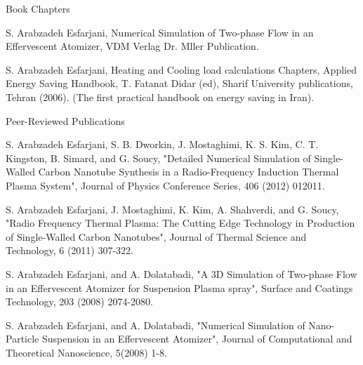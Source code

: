 


\begin{cventries}


\cventry
{} %
{Book Chapters} %
{} %
{} %
{ %
\vspace{-3 mm}
\begin{cvitems}
\item {S. Arabzadeh Esfarjani, Numerical Simulation of Two-phase Flow in an Effervescent Atomizer, VDM Verlag Dr. Mller Publication.}
\item {S. Arabzadeh Esfarjani, Heating and Cooling load calculations Chapters, Applied Energy
Saving Handbook, T. Fatanat Didar (ed), Sharif University publications, Tehran (2006).
(The first practical handbook on energy saving in Iran).\\}
\end{cvitems}
}


\cventry
{} %
{Peer-Reviewed Publications} %
{} %
{} %
{ %
\vspace{-3 mm}
\begin{cvitems}
\item {S. Arabzadeh Esfarjani, S. B. Dworkin, J. Mostaghimi, K. S. Kim, C. T. Kingston, B. Simard,
and G. Soucy, "Detailed Numerical Simulation of Single-Walled Carbon Nanotube Synthesis in a
Radio-Frequency Induction Thermal Plasma System", Journal of Physics Conference Series, 406
(2012) 012011.}
\item{S. Arabzadeh Esfarjani, J. Mostaghimi, K. Kim, A. Shahverdi, and G. Soucy, "Radio Frequency Thermal Plasma: The Cutting Edge Technology in Production of Single-Walled Carbon Nanotubes", Journal of Thermal Science and Technology, 6 (2011) 307-322.}
\item {S. Arabzadeh Esfarjani, and A. Dolatabadi, "A 3D Simulation of Two-phase Flow in an Effervescent Atomizer for Suspension Plasma spray", Surface and Coatings Technology, 203 (2008) 2074-2080.}
\item{S. Arabzadeh Esfarjani, and A. Dolatabadi, "Numerical Simulation of Nano-Particle Suspension in an Effervescent Atomizer", Journal of Computational and Theoretical Nanoscience, 5(2008) 1-8.\\}
\end{cvitems}
}


\end{cventries}
